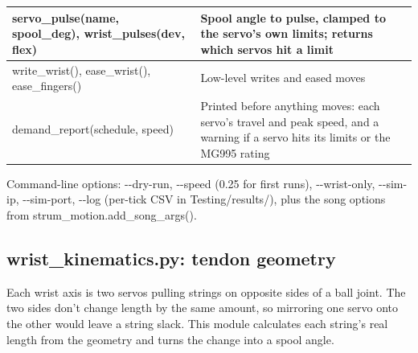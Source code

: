 \documentclass[11pt,letterpaper]{article}
\newcommand{\code}[1]{\textcolor{codeblue}{\ttfamily\smaller\relax #1}}
\begin{document}
{\begin{longtable}{|>{\raggedright\arraybackslash}p{}|>{\raggedright\arraybackslash}p{}|}
\code{servo\_\allowbreak{}pulse(name,\allowbreak{} spool\_\allowbreak{}deg)}, \code{wrist\_\allowbreak{}pulses(dev,\allowbreak{} flex)} & Spool angle to pulse, clamped to the servo's own limits; returns which servos hit a limit \\ \hline
\code{write\_\allowbreak{}wrist()}, \code{ease\_\allowbreak{}wrist()}, \code{ease\_\allowbreak{}fingers()} & Low-level writes and eased moves \\ \hline
\code{demand\_\allowbreak{}report(schedule,\allowbreak{} speed)} & Printed before anything moves: each servo's travel and peak speed, and a warning if a servo hits its limits or the MG995 rating \\ \hline
\end{longtable}}

Command-line options: \code{-{}-{}dry-{}\allowbreak{}run}, \code{-{}-{}speed} (0.25 for first runs), \code{-{}-{}wrist-{}\allowbreak{}only}, \code{-{}-{}sim-{}\allowbreak{}ip}, \code{-{}-{}sim-{}\allowbreak{}port}, \code{-{}-{}log} (per-tick CSV in \code{Testing/\allowbreak{}results/\allowbreak{}}), plus the song options from \code{strum\_\allowbreak{}motion.add\_\allowbreak{}song\_\allowbreak{}args()}.


\subsection{wrist\_kinematics.py: tendon geometry}
Each wrist axis is two servos pulling strings on opposite sides of a ball joint. The two sides don't change length by the same amount, so mirroring one servo onto the other would leave a string slack. This module calculates each string's real length from the geometry and turns the change into a spool angle.
\end{document}
